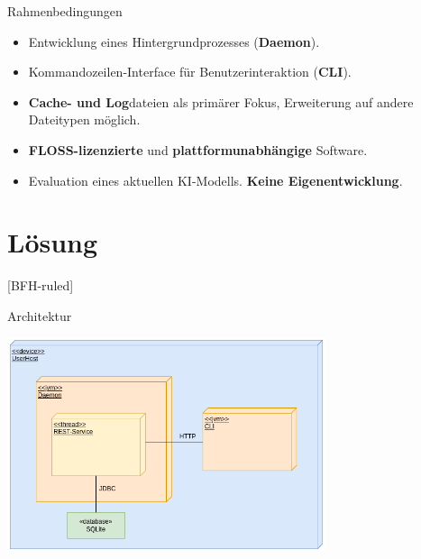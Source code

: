 \documentclass[
    ngerman,%
    authorontitle=true,
]{bfhbeamer}
\begin{document}
    \begin{frame}{Rahmenbedingungen}
        \begin{itemize}
            \item Entwicklung eines Hintergrundprozesses (\textbf{Daemon}).
            \item Kommandozeilen-Interface f\"ur Benutzerinteraktion (\textbf{CLI}).
            \item \textbf{Cache- und Log}dateien als prim\"arer Fokus, Erweiterung auf andere Dateitypen m\"oglich.
            \item \textbf{FLOSS-lizenzierte} und \textbf{plattformunabh\"angige} Software.
            \item Evaluation eines aktuellen KI-Modells. \textbf{Keine Eigenentwicklung}.
        \end{itemize}
    \end{frame}


    \section{Lösung}\label{sec:loesung}
    [BFH-ruled]
    \frame{\sectionpage}

    \begin{frame}{Architektur}
        \begin{center}
            \includegraphics[width=0.7\textwidth]{assets/DeplDiagram-v2}
        \end{center}
    \end{frame}
\end{document}
